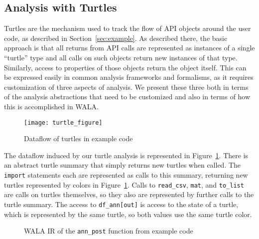\subsection{Analysis with Turtles}

 Turtles are the mechanism used to track the flow of API objects around the user code, as described in Section~\ref{sec:example}.  As described there,  the basic approach is that all returns from API calls are represented as instances of a single ``turtle'' type and all calls on such objects return new instances of that type.  Similarly, access to properties of those objects return the object itself.  This can be expressed easily in common analysis frameworks and formalisms, as it requires customization of three aspects of analysis.  We present these three both in terms of the analysis abstractions that need to be customized and also in terms of how this is accomplished in WALA.

\begin{figure}[htb]
\begin{center}
\texttt{[image: turtle\_figure]}
\end{center}
\caption{Dataflow of turtles in example code}
\label{fig:dataflow}
\end{figure}

The dataflow induced by our turtle analysis is represented in Figure~\ref{fig:dataflow}.  There is an abstract turtle summary that simply returns new turtles when called.  The {\tt import} statements each are represented as calls to this summary, returning new turtles represented by colors in Figure~\ref{fig:dataflow}.  Calls to {\tt read\_csv}, {\tt mat}, and {\tt to\_list} are calls on turtles themselves, so they also are represented by further calls to the turtle summary.  The access to {\tt df\_ann[out]} is access to the state of a turtle, which is represented by the same turtle, so both values use the same turtle color.
   
\begin{figure*}[htb]
\begin{centering}

\caption{WALA IR of the {\tt ann\_post} function from example code}
\label{code:ann_post}
\end{centering}
\end{figure*}

